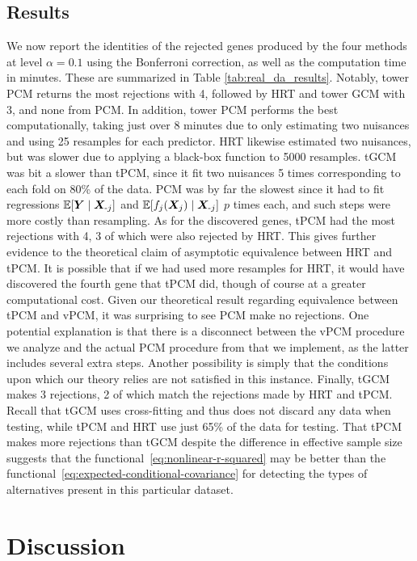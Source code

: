 \documentclass[12pt]{article}
\theoremstyle{definition}
\theoremstyle{remark}
\newcommand{\E}{\mathbb E}								%
\newcommand{\prx}{\bm X}								%
\newcommand{\pry}{{\bm Y}}								%
\newcommand{\minus}{\textnormal{-}} 						    %
\begin{document}
\subsection{Results}
We now report the identities of the rejected genes produced by the four methods at level $\alpha = 0.1$ using the Bonferroni correction, as well as the computation time in minutes. These are summarized in Table \ref{tab:real_da_results}. Notably, tower PCM returns the most rejections with 4, followed by HRT and tower GCM with 3, and none from PCM. In addition, tower PCM performs the best computationally, taking just over 8 minutes due to only estimating two nuisances and using 25 resamples for each predictor. HRT likewise estimated two nuisances, but was slower due to applying a black-box function to 5000 resamples. tGCM was bit a slower than tPCM, since it fit two nuisances 5 times corresponding to each fold on 80\% of the data. PCM was by far the slowest since it had to fit regressions $\E[\pry \mid \prx_{\minus j}]$ and $\E[f_j(\prx_j) \mid \prx_{\minus j}]$ $p$ times each, and such steps were more costly than resampling. As for the discovered genes, tPCM had the most rejections with 4, 3 of which were also rejected by HRT. This gives further evidence to the theoretical claim of asymptotic equivalence between HRT and tPCM. It is possible that if we had used more resamples for HRT, it would have discovered the fourth gene that tPCM did, though of course at a greater computational cost. Given our theoretical result regarding equivalence between tPCM and vPCM, it was surprising to see PCM make no rejections. One potential explanation is that there is a disconnect between the vPCM procedure we analyze and the actual PCM procedure from \citet{Lundborg2022a} that we implement, as the latter includes several extra steps. Another possibility is simply that the conditions upon which our theory relies are not satisfied in this instance. Finally, tGCM makes 3 rejections, 2 of which match the rejections made by HRT and tPCM. Recall that tGCM uses cross-fitting and thus does not discard any data when testing, while tPCM and HRT use just 65\% of the data for testing. That tPCM makes more rejections than tGCM despite the difference in effective sample size suggests that the functional~\eqref{eq:nonlinear-r-squared} may be better than the functional~\eqref{eq:expected-conditional-covariance} for detecting the types of alternatives present in this particular dataset.


\section{Discussion}
\end{document}
